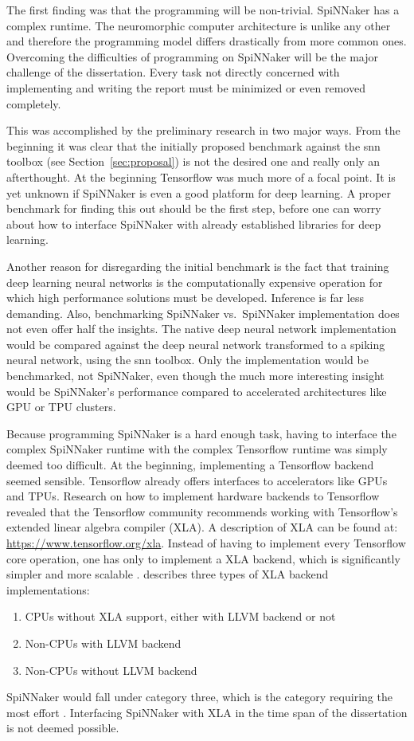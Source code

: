 \documentclass{article}
\begin{document}
The first finding was that the programming will be non-trivial.
SpiNNaker has a complex runtime.
The neuromorphic computer architecture is unlike any other
and therefore the programming model differs drastically
from more common ones.
Overcoming the difficulties of programming on SpiNNaker
will be the major challenge of the dissertation.
Every task not directly concerned with implementing and writing the
report must be minimized or even removed completely.

This was accomplished by the preliminary research in two
major ways.
From the beginning it was clear that the initially
proposed benchmark against the snn toolbox (see
Section~\ref{sec:proposal}) is not the desired one and
really only an afterthought.
At the beginning Tensorflow was much more of a focal point.
It is yet unknown if SpiNNaker is even a good platform for deep
learning.
A proper benchmark for finding this out should be the first step,
before one can worry about how to interface SpiNNaker with
already established libraries for deep learning.

Another reason for disregarding the initial benchmark is the fact
that training deep learning neural networks is the computationally
expensive operation for which high performance solutions must be
developed.
Inference is far less demanding.
Also, benchmarking SpiNNaker vs.\ SpiNNaker implementation
does not even offer half the insights.
The native deep neural network implementation would be compared
against the deep neural network transformed to a spiking neural
network, using the snn toolbox.
Only the implementation would be benchmarked, not
SpiNNaker, even though the much more interesting insight
would be SpiNNaker's performance compared to accelerated architectures
like GPU or TPU clusters.

Because programming SpiNNaker is a hard enough task,
having to interface the complex SpiNNaker runtime with the
complex Tensorflow runtime was simply deemed too difficult.
At the beginning, implementing a Tensorflow backend seemed
sensible.
Tensorflow already offers interfaces to accelerators like GPUs and
TPUs.
Research on how to implement hardware backends to
Tensorflow revealed that the Tensorflow community
recommends working with Tensorflow's extended linear
algebra compiler (XLA).
A description of XLA can be found at:
\url{https://www.tensorflow.org/xla}.
Instead of having to implement every Tensorflow core
operation, one has only to implement a XLA backend, which
is significantly simpler and more scalable
\citep{xla_backend}.
\citet{xla_backend} describes three types of XLA backend
implementations:
\begin{enumerate}
  \item CPUs without XLA support, either with LLVM backend
    or not
  \item Non-CPUs with LLVM backend
  \item Non-CPUs without LLVM backend
\end{enumerate}
SpiNNaker would fall under category three, which is the category
requiring the most effort \citep{xla_backend}.
Interfacing SpiNNaker with XLA in the time span of the
dissertation is not deemed possible.
\end{document}
